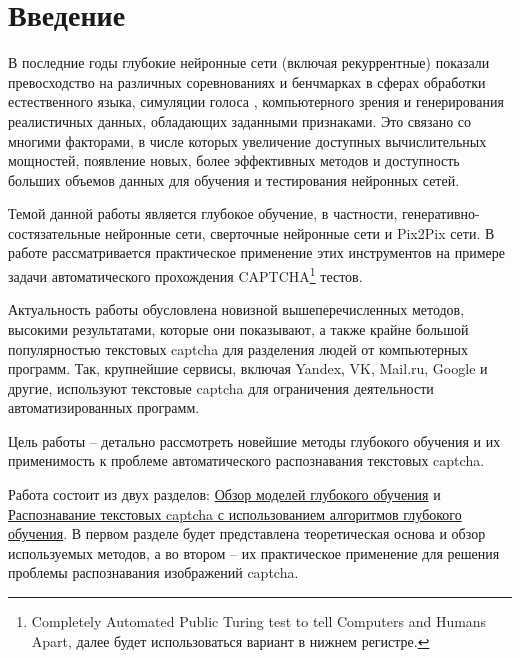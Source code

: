 \section*{Введение}
В последние годы глубокие нейронные сети (включая рекуррентные) показали превосходство на различных соревнованиях и бенчмарках в сферах обработки естественного языка\cite{nlp-trends}, симуляции голоса \cite{gan-voice-synthesis}, компьютерного зрения\cite{cnn-imagenet} и генерирования реалистичных данных, обладающих заданными признаками. Это связано со многими факторами, в числе которых увеличение доступных вычислительных мощностей, появление новых, более эффективных методов и доступность больших объемов данных для обучения и тестирования нейронных сетей.

Темой данной работы является глубокое обучение, в частности, ге\-не\-ра\-тивно-состязательные нейронные сети, сверточные нейронные сети и Pix2Pix сети. В работе рассматривается практическое применение этих инструментов на примере задачи автоматического прохождения CAPTCHA\footnote{Completely Automated Public Turing test to tell Computers and Humans Apart, далее будет использоваться вариант в нижнем регистре.} тестов.

Актуальность работы обусловлена новизной вышеперечисленных методов, высокими результатами, которые они показывают, а также крайне большой популярностью текстовых captcha для разделения людей от компьютерных программ. Так, крупнейшие сервисы, включая Yandex, VK, Mail.ru, Google и другие, используют текстовые captcha для ограничения деятельности автоматизированных программ.

Цель работы -- детально рассмотреть новейшие методы глубокого обучения и их применимость к проблеме автоматического распознавания текстовых captcha.

Работа состоит из двух разделов: \hyperref[sec:section-1]{Обзор моделей глубокого обучения} и \hyperref[sec:section-2]{Распознавание текстовых captcha с использованием алгоритмов глубокого обучения}. В первом разделе будет представлена теоретическая основа и обзор используемых методов, а во втором – их практическое применение для решения проблемы распознавания изображений captcha.
